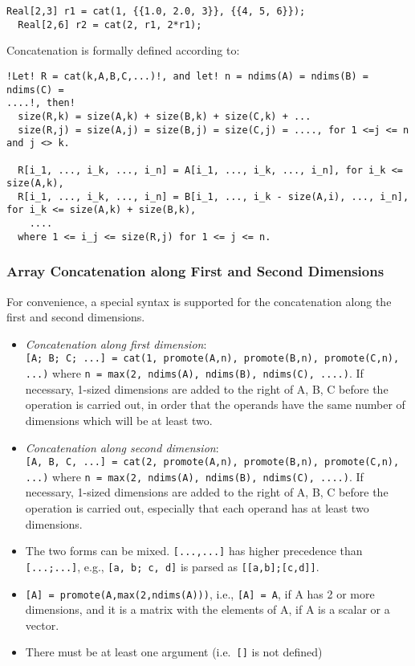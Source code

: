 \begin{example}
\begin{lstlisting}[language=modelica]
  Real[2,3] r1 = cat(1, {{1.0, 2.0, 3}}, {{4, 5, 6}});
  Real[2,6] r2 = cat(2, r1, 2*r1);
\end{lstlisting}
\end{example}

Concatenation is formally defined according to:
\begin{lstlisting}[language=modelica, escapechar=!]
!Let! R = cat(k,A,B,C,...)!, and let! n = ndims(A) = ndims(B) = ndims(C) =
....!, then!
  size(R,k) = size(A,k) + size(B,k) + size(C,k) + ...
  size(R,j) = size(A,j) = size(B,j) = size(C,j) = ...., for 1 <=j <= n and j <> k.

  R[i_1, ..., i_k, ..., i_n] = A[i_1, ..., i_k, ..., i_n], for i_k <= size(A,k),
  R[i_1, ..., i_k, ..., i_n] = B[i_1, ..., i_k - size(A,i), ..., i_n], for i_k <= size(A,k) + size(B,k),
    ....
  where 1 <= i_j <= size(R,j) for 1 <= j <= n.
\end{lstlisting}


\subsubsection{Array Concatenation along First and Second Dimensions}

For convenience, a special syntax is supported for the concatenation
along the first and second dimensions.

\begin{itemize}
\item
  \emph{Concatenation along first dimension}:\\
\lstinline![A; B; C; ...] = cat(1, promote(A,n), promote(B,n), promote(C,n),  ...)!
where \lstinline!n = max(2, ndims(A), ndims(B), ndims(C), ....)!. If necessary, 1-sized
  dimensions are added to the right of A, B, C before the operation is
  carried out, in order that the operands have the same number of
  dimensions which will be at least two.
\item
  \emph{Concatenation along second dimension}:\\
\lstinline![A, B, C, ...] = cat(2, promote(A,n), promote(B,n), promote(C,n), ...)!
where \lstinline!n = max(2, ndims(A), ndims(B), ndims(C), ....)!. If necessary, 1-sized
  dimensions are added to the right of A, B, C before the operation is
  carried out, especially that each operand has at least two dimensions.
\item
  The two forms can be mixed. \lstinline![...,...]! has higher precedence than
 \lstinline![...;...]!, e.g., \lstinline![a, b; c, d]! is parsed as \lstinline![[a,b];[c,d]]!.
\item
\lstinline![A] = promote(A,max(2,ndims(A)))!, i.e., \lstinline![A] = A!, if A has 2 or
  more dimensions, and it is a matrix with the elements of A, if A is a
  scalar or a vector.
\item
  There must be at least one argument (i.e.\ \lstinline![]! is not defined)
\end{itemize}

